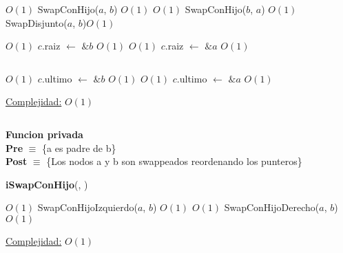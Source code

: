 \begin{Algoritmos}
\begin{algorithm}[H]
\begin{algorithmic}[1]
     \Comment $O(1)$
        \State SwapConHijo($a$, $b$) \Comment $O(1)$
    \Else 
         \Comment $O(1)$
            \State SwapConHijo($b$, $a$) \Comment $O(1)$
        \Else
            \State SwapDisjunto($a$, $b$)\Comment $O(1)$
        \EndIf 
    \EndIf 

     \Comment $O(1)$
        \State $c$.raiz $\gets$ $\&b$ \Comment $O(1)$
    \Else
         \Comment $O(1)$
            \State $c$.raiz $\gets$ $\&a$ \Comment $O(1)$
        \EndIf
    \EndIf

    \State $ $ 

     \Comment $O(1)$
        \State $c$.ultimo $\gets$ $\&b$ \Comment $O(1)$
    \Else
         \Comment $O(1)$
            \State $c$.ultimo $\gets$ $\&a$ \Comment $O(1)$
        \EndIf
    \EndIf


    \medskip
    \Statex \underline{Complejidad:} $O(1)$

\end{algorithmic}
\end{algorithm}




$ $\newline

\textbf{Funcion privada}\\
\textbf{Pre} $\equiv$ \{a es padre de b\}\\%
\textbf{Post} $\equiv$ \{Los nodos a y b son swappeados reordenando los punteros\}%
\begin{algorithm}[H]
{\textbf{iSwapConHijo}(, )}
\begin{algorithmic}[1]

     \Comment $O(1)$
        \State SwapConHijoIzquierdo($a$, $b$) \Comment $O(1)$
    \Else {} \Comment $O(1)$
            \State SwapConHijoDerecho($a$, $b$) \Comment $O(1)$
        \EndIf 
    \EndIf 

    \medskip
    \Statex \underline{Complejidad:} $O(1)$

\end{algorithmic}
\end{algorithm}

$ $\newline



$ $\newline


\end{Algoritmos}
